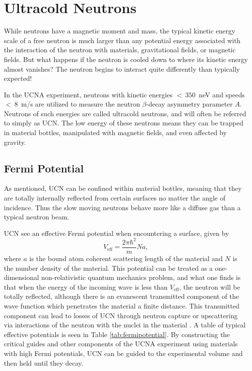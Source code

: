 \section{Ultracold Neutrons}

While neutrons have a magnetic moment and mass, the typical kinetic energy scale
of a free neutron is much larger than any potential energy associated with
the interaction of the neutron with materials, gravitational fields,
or magnetic fields. But what happens if the neutron is cooled down
to where its kinetic energy almost vanishes? The neutron begins to interact
quite differently than typically expected!

In the UCNA experiment, neutrons
with kinetic energies $<~350$~neV and speeds $<~8$~m/s are utilized to measure
the neutron $\beta$-decay asymmetry parameter $A$. Neutrons of such energies
are called ultracold neutrons, and will often be referred to simply as UCN. The
low energy of these neutrons means they can be trapped in material bottles, manipulated
with magnetic fields, and even affected by gravity.

\subsection{Fermi Potential} \label{sssec:fermipotential}

As mentioned, UCN can be confined within material bottles, meaning that they are
totally internally reflected from certain surfaces no matter the angle of incidence.
Thus the slow moving neutrons behave more like a diffuse gas than a typical neutron
beam.

UCN see an effective Fermi potential when encountering a surface, given by
%
\begin{equation}
  V_{\mathrm{eff}} = \frac{2\pi\hbar^2}{m}Na,
\end{equation}
where $a$ is the bound atom coherent scattering length of the material and $N$ is the number density of
the material. This potential can be treated as a one-dimensional non-relativistic quantum mechanics problem,
and what one finds is that when the energy of the incoming wave is less than $V_{\mathrm{eff}}$, the neutron will be
totally reflected, although there is an evanescent transmitted component of the wave function which penetrates the
material a finite distance. This transmitted component can lead to losses of UCN through neutron capture or
upscattering via interactions of the neutron with the nuclei
in the material \cite{golub1991ultra}. A table of typical effective potentials is seen
in Table \ref{tab:fermipotential}.
By constructing the critical guides and other components of the UCNA experiment using materials with high
Fermi potentials, UCN can be guided to the experimental volume and then held until they decay.


